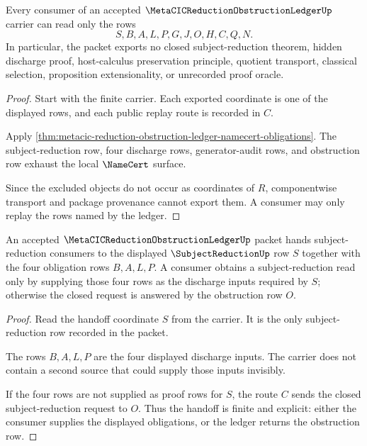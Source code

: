 \begin{theorem}
\label{thm:metacic-reduction-obstruction-ledger-nonescape}
Every consumer of an accepted $\MetaCICReductionObstructionLedgerUp$ carrier can read only the rows
$$
S,B,A,L,P,G,J,O,H,C,Q,N.
$$
In particular, the packet exports no closed subject-reduction theorem, hidden discharge proof, host-calculus preservation principle, quotient transport, classical selection, proposition extensionality, or unrecorded proof oracle.
\end{theorem}
\begin{proof}
Start with the finite carrier. Each exported coordinate is one of the displayed rows, and each public replay route is recorded in $C$.

Apply \autoref{thm:metacic-reduction-obstruction-ledger-namecert-obligations}. The subject-reduction row, four discharge rows, generator-audit rows, and obstruction row exhaust the local $\NameCert$ surface.

Since the excluded objects do not occur as coordinates of $R$, componentwise transport and package provenance cannot export them. A consumer may only replay the rows named by the ledger.
\end{proof}

\begin{theorem}
\label{thm:metacic-reduction-obstruction-ledger-subjectreduction-handoff}
An accepted $\MetaCICReductionObstructionLedgerUp$ packet hands subject-reduction consumers to the displayed $\SubjectReductionUp$ row $S$ together with the four obligation rows $B,A,L,P$. A consumer obtains a subject-reduction read only by supplying those four rows as the discharge inputs required by $S$; otherwise the closed request is answered by the obstruction row $O$.
\end{theorem}
\begin{proof}
Read the handoff coordinate $S$ from the carrier. It is the only subject-reduction row recorded in the packet.

The rows $B,A,L,P$ are the four displayed discharge inputs. The carrier does not contain a second source that could supply those inputs invisibly.

If the four rows are not supplied as proof rows for $S$, the route $C$ sends the closed subject-reduction request to $O$. Thus the handoff is finite and explicit: either the consumer supplies the displayed obligations, or the ledger returns the obstruction row.
\end{proof}

